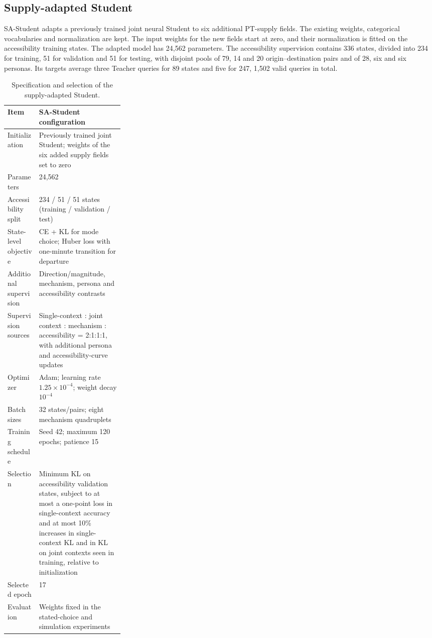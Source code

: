 \subsection{Supply-adapted Student}
\label{sec:s9_recipe}
SA-Student adapts a previously trained joint neural Student to six additional PT-supply fields. The existing weights, categorical vocabularies and normalization are kept. The input weights for the new fields start at zero, and their normalization is fitted on the accessibility training states. The adapted model has 24,562 parameters. The accessibility supervision contains 336 states, divided into 234 for training, 51 for validation and 51 for testing, with disjoint pools of 79, 14 and 20 origin--destination pairs and of 28, six and six personas. Its targets average three Teacher queries for 89 states and five for 247, 1,502 valid queries in total.

\begin{table}[pos=htbp]
\centering\small
\caption{Specification and selection of the supply-adapted Student.}
\label{tab:s9_spec}
\renewcommand{\arraystretch}{1.14}
\begin{tabularx}{\linewidth}{@{}p{0.27\linewidth}X@{}}
\toprule
Item & SA-Student configuration \\
\midrule
Initialization & Previously trained joint Student; weights of the six added supply fields set to zero \\
Parameters & 24,562 \\
Accessibility split & 234 / 51 / 51 states (training / validation / test) \\
State-level objective & CE + KL for mode choice; Huber loss with one-minute transition for departure \\
Additional supervision & Direction/magnitude, mechanism, persona and accessibility contrasts \\
Supervision sources & Single-context : joint context : mechanism : accessibility = 2:1:1:1, with additional persona and accessibility-curve updates \\
Optimizer & Adam; learning rate $1.25\times10^{-4}$; weight decay $10^{-4}$ \\
Batch sizes & 32 states/pairs; eight mechanism quadruplets \\
Training schedule & Seed 42; maximum 120 epochs; patience 15 \\
Selection & Minimum KL on accessibility validation states, subject to at most a one-point loss in single-context accuracy and at most 10\% increases in single-context KL and in KL on joint contexts seen in training, relative to initialization \\
Selected epoch & 17 \\
Evaluation & Weights fixed in the stated-choice and simulation experiments \\
\bottomrule
\end{tabularx}
\end{table}

